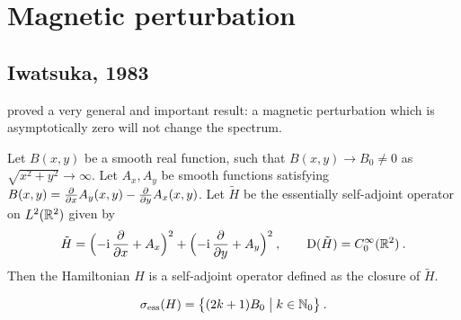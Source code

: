 \section{Magnetic perturbation}
\label{section-known-magnetic}

\subsection{Iwatsuka, 1983}
\cite{Iwatsuka1983} proved a very general and important result: a magnetic perturbation which is asymptotically zero will not change the spectrum.
\begin{defn}
    Let $B(x, y)$ be a smooth real function, such that $B(x, y) \to B_0 \neq 0$ as $\sqrt{x^2 + y^2} \to \infty$. Let $A_x, A_y$ be smooth functions satisfying $B(x,y) = \frac{\partial }{\partial x} A_y(x,y) - \frac{\partial }{\partial y} A_x(x,y)$. Let $\tilde H$ be the essentially self-adjoint operator on $L^2(\mathbb{R}^2)$ given by
    \begin{gather*}
        \tilde H
        = \Big( {-\mathrm{i}} \, \frac{\partial }{\partial x} + A_x \Big)^2
        + \Big( {-\mathrm{i}} \, \frac{\partial }{\partial y} + A_y \Big)^2
        \: , \qquad
        \mathrm{D}(\tilde H) = C_0^\infty(\mathbb{R}^2)
        \: .
    \end{gather*}
    Then the Hamiltonian $H$ is a self-adjoint operator defined as the closure of $\tilde H$.
\end{defn}
\begin{thm}[Spectrum of $H$] \label{thm-Iwatsuka-unperturb}
    $$
        \sigma_{\mathrm{ess}}(H) = \big\{ (2k + 1) B_0  \;\big|\; k \in \mathbb{N}_0 \big\}
        \: .
    $$
\end{thm}


